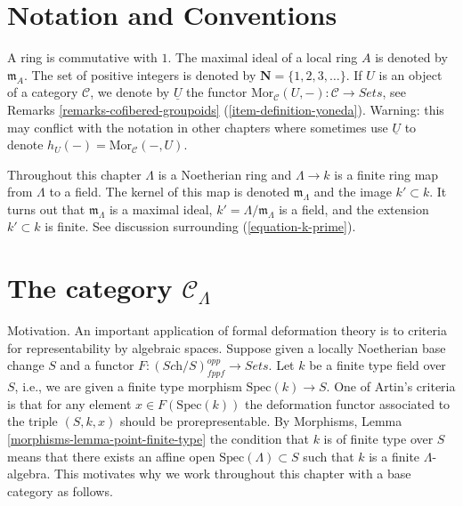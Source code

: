 \section{Notation and Conventions}
\label{section-notations-conventions}

\noindent
A ring is commutative with $1$. The  maximal ideal of a local ring $A$
is denoted by $\mathfrak{m}_{A}$. The set of positive integers is denoted
by $\mathbf{N} = \{1, 2, 3, \dots\}$. If $U$ is an object of a
category $\mathcal{C}$, we denote by $\underline{U}$ 
the functor
$\text{Mor}_\mathcal{C}(U, -): \mathcal{C} \to \textit{Sets}$, see
Remarks \ref{remarks-cofibered-groupoids} (\ref{item-definition-yoneda}).
Warning: this may conflict with the notation in other chapters where sometimes
use $\underline{U}$ to denote $h_U(-) = \text{Mor}_\mathcal{C}(-, U)$.

\medskip\noindent
Throughout this chapter $\Lambda$ is a Noetherian ring and
$\Lambda \to k$ is a finite ring map from $\Lambda$ to a field.
The kernel of this map is denoted $\mathfrak m_\Lambda$ and the
image $k' \subset k$. It turns out that $\mathfrak m_\Lambda$ is
a maximal ideal, $k' = \Lambda/\mathfrak m_\Lambda$ is a field, and
the extension $k' \subset k$ is finite. See discussion surrounding
(\ref{equation-k-prime}).


\section{The category $\mathcal{C}_\Lambda$}
\label{section-CLambda}

\noindent
Motivation. An important application of formal deformation theory is
to criteria for representability by algebraic spaces. Suppose given a
locally Noetherian base change $S$ and a functor
$F : (\textit{Sch}/S)_{fppf}^{opp} \to \textit{Sets}$.
Let $k$ be a finite type field over $S$, i.e., we are given a
finite type morphism $\text{Spec}(k) \to S$.
One of Artin's criteria is that for any element $x \in F(\text{Spec}(k))$ 
the deformation functor associated to
the triple $(S, k, x)$ should be prorepresentable. By
Morphisms, Lemma \ref{morphisms-lemma-point-finite-type}
the condition that $k$ is of finite type over $S$ means that there exists
an affine open $\text{Spec}(\Lambda) \subset S$ such that $k$
is a finite $\Lambda$-algebra. This motivates why we work throughout
this chapter with a base category as follows.

